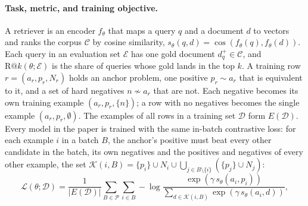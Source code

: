 \paragraph{Task, metric, and training objective.}
A retriever is an encoder $f_\theta$ that maps a query $q$ and a document $d$ to vectors and ranks the corpus $\mathcal{C}$ by cosine similarity, $s_\theta(q,d) = \cos(f_\theta(q), f_\theta(d))$. Each query in an evaluation set $\mathcal{E}$ has one gold document $d_q^{+} \in \mathcal{C}$, and $\mathrm{R}@k(\theta;\mathcal{E})$ is the share of queries whose gold lands in the top $k$. A training row $r = (a_r, p_r, N_r)$ holds an anchor problem, one positive $p_r \sim a_r$ that is equivalent to it, and a set of hard negatives $n \not\sim a_r$ that are not. Each negative becomes its own training example $(a_r,p_r,\{n\})$; a row with no negatives becomes the single example $(a_r,p_r,\emptyset)$. The examples of all rows in a training set $\mathcal{D}$ form $E(\mathcal{D})$. Every model in the paper is trained with the same in-batch contrastive loss: for each example $i$ in a batch $B$, the anchor's positive must beat every other candidate in the batch, its own negatives and the positives and negatives of every other example, the set $\mathcal{K}(i,B) = \{p_i\} \cup N_i \cup \bigcup_{j \in B \setminus \{i\}} (\{p_j\} \cup N_j)$:
\begin{equation}
\label{eq:loss}
\mathcal{L}(\theta;\mathcal{D}) = \frac{1}{|E(\mathcal{D})|}
  \sum_{B \in \mathcal{P}} \sum_{i \in B} -\log
  \frac{\exp(\gamma\, s_\theta(a_i,p_i))}
       {\sum_{d \in \mathcal{K}(i,B)} \exp(\gamma\, s_\theta(a_i,d))},
\end{equation}
